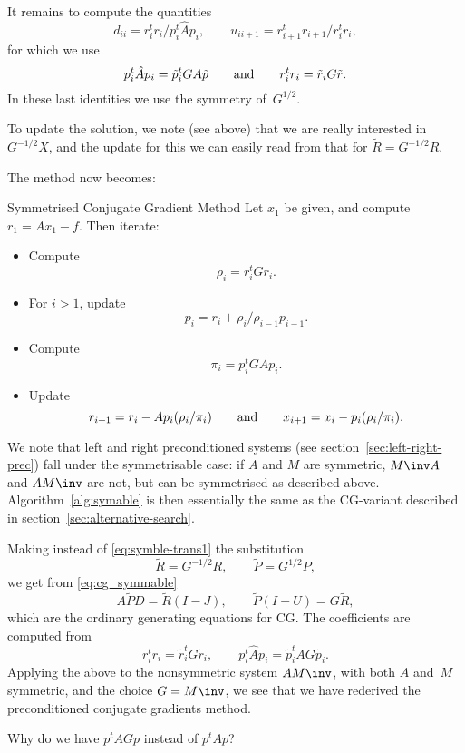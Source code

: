 \documentclass[11pt]{artikel3}
\begin{document}
\begin{Outline}
It remains to compute the quantities
\[ d_{ii}=r_i^tr_i/p_i^t\hat Ap_i,\qquad
    u_{ii+1}=r_{i+1}^tr_{i+1}/r_i^tr_i, \]
for which we use
\[ p_i^t\hat Ap_i=\tilde p_i^tGA\tilde p \qquad\hbox{and}\qquad
   r_i^tr_i=\tilde r_iG\tilde r.\]
In these last identities we use the symmetry of~$G^{1/2}$.

To update the solution, we note (see above) that we are really interested
in $G^{-1/2}X$, and the update for this we can easily read from
that for $\tilde R=G^{-1/2}R$.

The method now becomes:
\begin{algorithm}{Symmetrised Conjugate Gradient Method}
\label{alg:symable}
Let $x_1$ be given, and compute $r_1=Ax_1-f$.
Then iterate:
\begin{itemize}
\item Compute \[\rho_i=r_i^tGr_i.\]
\item For $i>1$, update \[ p_i=r_i+\rho_i/\rho_{i-1}p_{i-1}.\]
\item Compute \[\pi_i=p_i^tGAp_i.\]
\item Update \[ r_{i+1}=r_i-Ap_i(\rho_i/\pi_i) \qquad\hbox{and}\qquad
                x_{i+1}=x_i-p_i(\rho_i/\pi_i).\]
\end{itemize}
\end{algorithm}

We note that left and right preconditioned systems
(see section~\ref{sec:left-right-prec})
fall under the symmetrisable case: if $A$ and $M$ are symmetric,
$M\inv A$ and $AM\inv$ are not, but can be symmetrised
as described above. Algorithm~\ref{alg:symable} is then essentially
the same as the CG-variant described in section~\ref{sec:alternative-search}.

Making instead of \eqref{eq:symble-trans1} the substitution
\begin{equation} \tilde R=G^{-1/2}R,\qquad \tilde P=G^{1/2}P,
    \label{eq:symble-trans2}\end{equation}
we get from \eqref{eq:cg_symmable}
\[ A\tilde PD=\tilde R(I-J),\qquad \tilde P(I-U)=G\tilde R, \]
which are the ordinary generating equations for CG.
The coefficients are computed
from
\[ r_i^tr_i=\tilde r_i^tG\tilde r_i,\qquad
    p_i^t\hat Ap_i=\tilde p_i^tAG\tilde p_i. \]
Applying the above to the nonsymmetric system $AM\inv$, 
with both $A$ and~$M$ symmetric, and the choice $G=M\inv$,
we see that we have rederived the preconditioned conjugate gradients method.
\begin{question}
Why do we have $p^tAGp$ instead of $p^tAp$?
\end{question}



\end{Outline}
\end{document}

